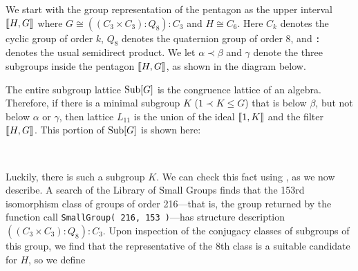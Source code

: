 We start with the group representation of the pentagon as the upper
interval $\llbracket H, G\rrbracket$ 
where $G \cong ((C_3 \times C_3) : Q_8) : C_3$ and 
$H \cong C_6$.  Here $C_k$ denotes the cyclic group of order $k$, $Q_8$ denotes the
quaternion group of order 8, and {\tt :} denotes the usual semidirect product.
We let $\alpha \prec \beta$ and $\gamma$ denote the three
subgroups inside the pentagon $\llbracket H, G \rrbracket$, as shown in the diagram below.  

The entire subgroup lattice
$\operatorname{Sub}[G]$ is the congruence lattice of an algebra. Therefore, if there is a minimal
subgroup $K$ ($1 \prec K \leq G$) that is below $\beta$, but not below 
$\alpha$ or $\gamma$, then lattice $L_{11}$ is the 
union of the ideal $\llbracket 1, K\rrbracket$ and the filter $\llbracket H, G\rrbracket$.
This portion of $\operatorname{Sub}[G]$ is shown here: 

\begin{figure}
\begin{center}
\end{center}
\caption{ \ }
\end{figure}

Luckily, there is
such a subgroup $K$. We can check this fact using \gap, as we now describe.
A search of the \gap Library of Small Groups finds that the 153rd
isomorphism class of groups of order 216---that is, the group 
returned by the function call {\tt SmallGroup( 216, 153 )}---has 
structure description $((C_3 \times C_3) : Q_8) : C_3$.
Upon inspection of the conjugacy classes of subgroups of this group, we 
find that the representative of the 8th class is a suitable candidate for 
$H$, so we define 

